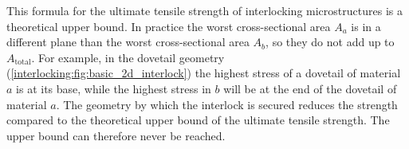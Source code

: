 This formula for the ultimate tensile strength of interlocking microstructures is a theoretical upper bound.
In practice the worst cross-sectional area $A_a$ is in a different plane than the worst cross-sectional area $A_b$, so they do not add up to $A_\text{total}$.
For example, in the dovetail geometry (\cref{interlocking:fig:basic_2d_interlock}) the highest stress of a dovetail of material $a$ is at its base, while the highest stress in $b$ will be at the end of the dovetail of material $a$.
The geometry by which the interlock is secured reduces the strength compared to the theoretical upper bound of the ultimate tensile strength.
The upper bound can therefore never be reached.







